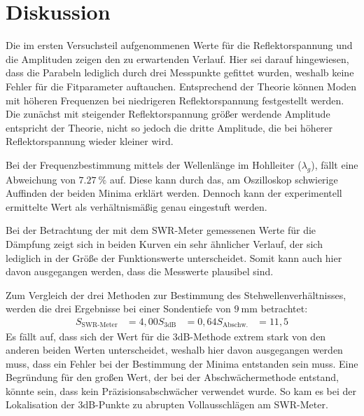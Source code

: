 \section{Diskussion}
Die im ersten Versuchsteil aufgenommenen Werte für die Reflektorspannung und die Amplituden
zeigen den zu erwartenden Verlauf. Hier sei darauf hingewiesen, dass die Parabeln
lediglich durch drei Messpunkte gefittet wurden, weshalb keine Fehler für die Fitparameter auftauchen.
Entsprechend der Theorie können Moden mit höheren Frequenzen bei niedrigeren Reflektorspannung festgestellt werden.
Die zunächst mit steigender Reflektorspannung größer werdende Amplitude entspricht der Theorie,
nicht so jedoch die dritte Amplitude, die bei höherer Reflektorspannung wieder kleiner wird.

\nodindent Bei der Frequenzbestimmung mittels der Wellenlänge im Hohlleiter ($\lambda_{g}$), fällt
eine Abweichung von $\SI{7,27}{\percent}$ auf. Diese kann durch das, am Oszilloskop schwierige
Auffinden der beiden Minima erklärt werden. Dennoch kann der experimentell ermittelte Wert als verhältnismäßig genau
eingestuft werden.

\noindent Bei der Betrachtung der mit dem SWR-Meter gemessenen Werte für die Dämpfung
zeigt sich in beiden Kurven ein sehr ähnlicher Verlauf, der sich lediglich in der Größe
der Funktionswerte unterscheidet. Somit kann auch hier davon ausgegangen werden, dass die
Messwerte plausibel sind.

\noindent
Zum Vergleich der drei Methoden zur Bestimmung des Stehwellenverhältnisses, werden die
drei Ergebnisse bei einer Sondentiefe von $\SI{9}{\mm}$ betrachtet:
\begin{align*}
    S_{\text{SWR-Meter}} &= 4,00
    S_{\text{3dB}} &= 0,64
    S_{\text{Abschw.}} &=11,5
\end{align*}
Es fällt auf, dass sich der Wert für die 3dB-Methode extrem stark von den anderen beiden
Werten unterscheidet, weshalb hier davon ausgegangen werden muss, dass ein Fehler bei der Bestimmung der
Minima entstanden sein muss.
Eine Begründung für den großen Wert, der bei der Abschwächermethode entstand, könnte sein,
dass kein Präzisionsabschwächer verwendet wurde. So kam es bei der Lokalisation der 3dB-Punkte zu
abrupten Vollausschlägen am SWR-Meter.
